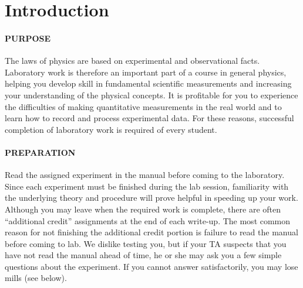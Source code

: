 
\vspace{-1ex}\part*{Introduction}

\subsection*{PURPOSE}

The laws of physics are based on experimental and observational facts.  Laboratory work is therefore an important part of a course in general physics, helping you develop skill in fundamental scientific measurements and increasing your understanding of the physical concepts.  It is profitable for you to experience the difficulties of making quantitative measurements in the real world and to learn how to record and process experimental data.  For these reasons, successful completion of laboratory work is required of every student.

\subsection*{PREPARATION}

\begin{comment}
Read the lab manual for the assigned experiment before coming to the lab.  Since the experiments must be finished during the lab sessions, this will greatly speed up your lab work, and in this lab series, you may leave early if you finish the work.  Although we dislike testing you, if your TA suspects that you haven't read the lab manual before coming to lab, he or she may ask you directly, or ask you a few simple questions about the experiment.  If you cannot answer satisfactorily, you may lose mills (see below).
\end{comment}
Read the assigned experiment in the manual before coming to the laboratory.  Since each experiment must be finished during the lab session, familiarity with the underlying theory and procedure will prove helpful in speeding up your work.  Although you may leave when the required work is complete, there are often ``additional credit'' assignments at the end of each write-up.  The most common reason for not finishing the additional credit portion is failure to read the manual before coming to lab.  We dislike testing you, but if your TA suspects that you have not read the manual ahead of time, he or she may ask you a few simple questions about the experiment.  If you cannot answer satisfactorily, you may lose mills (see below).

